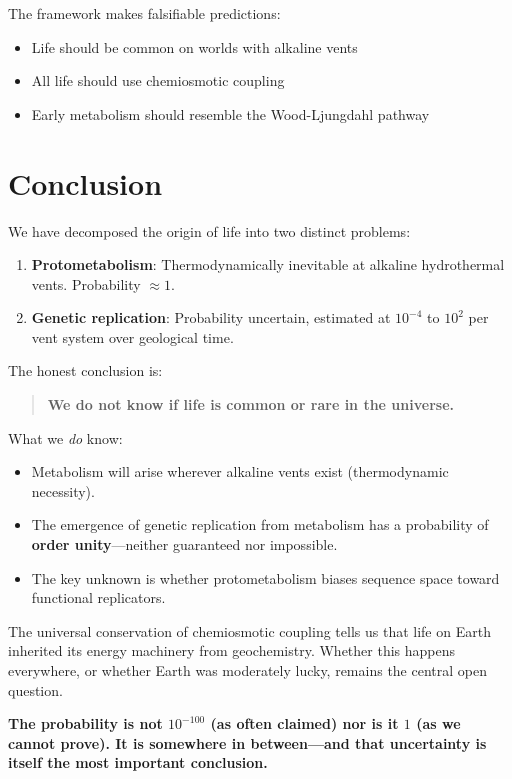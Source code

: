 \documentclass[11pt,twocolumn]{article}
\begin{document}
The framework makes falsifiable predictions:
\begin{itemize}
\item Life should be common on worlds with alkaline vents
\item All life should use chemiosmotic coupling
\item Early metabolism should resemble the Wood-Ljungdahl pathway
\end{itemize}

\section{Conclusion}

We have decomposed the origin of life into two distinct problems:

\begin{enumerate}
\item \textbf{Protometabolism}: Thermodynamically inevitable at alkaline hydrothermal vents. Probability $\approx 1$.

\item \textbf{Genetic replication}: Probability uncertain, estimated at $10^{-4}$ to $10^{2}$ per vent system over geological time.
\end{enumerate}

The honest conclusion is:

\begin{quote}
\textbf{We do not know if life is common or rare in the universe.}
\end{quote}

What we \textit{do} know:
\begin{itemize}
\item Metabolism will arise wherever alkaline vents exist (thermodynamic necessity).
\item The emergence of genetic replication from metabolism has a probability of \textbf{order unity}—neither guaranteed nor impossible.
\item The key unknown is whether protometabolism biases sequence space toward functional replicators.
\end{itemize}

The universal conservation of chemiosmotic coupling tells us that life on Earth inherited its energy machinery from geochemistry. Whether this happens everywhere, or whether Earth was moderately lucky, remains the central open question.

\textbf{The probability is not $10^{-100}$ (as often claimed) nor is it $1$ (as we cannot prove). It is somewhere in between—and that uncertainty is itself the most important conclusion.}
\end{document}
